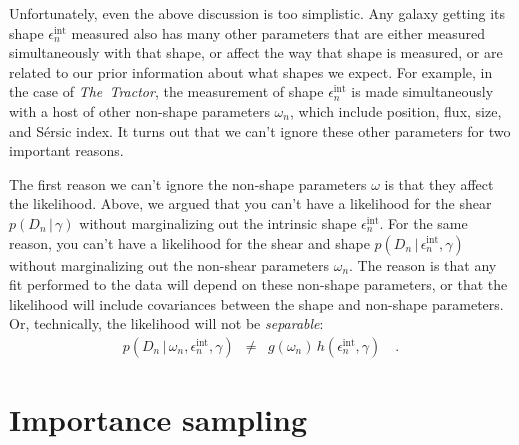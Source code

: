 \documentclass[12pt]{article}
\newcommand{\project}[1]{\textsl{#1}}
\newcommand{\thetractor}{\project{The~Tractor}}
\newcommand{\given}{\,|\,}
\newcommand{\data}{D}
\newcommand{\shear}{\gamma}
\newcommand{\ellip}{\epsilon}
\newcommand{\intrinsic}{\ellip^{\mathrm{int}}}
\newcommand{\nspars}{\omega}
\begin{document}
Unfortunately, even the above discussion is too simplistic.
Any galaxy getting its shape $\intrinsic_n$ measured
  also has many other parameters that are either measured simultaneously with that shape,
  or affect the way that shape is measured,
  or are related to our prior information about what shapes we expect.
For example, in the case of \thetractor,
  the measurement of shape $\intrinsic_n$ is made simultaneously with a host of other
  non-shape parameters $\nspars_n$,
  which include position, flux, size, and S\'ersic index.
It turns out that we can't ignore these other parameters for two important reasons.

The first reason we can't ignore the non-shape parameters $\nspars$ is that they affect the likelihood.
Above, we argued that you can't have a likelihood for the shear $p(\data_n\given\shear)$ 
  without marginalizing out the intrinsic shape $\intrinsic_n$.
For the same reason, you can't have a likelihood for the shear and shape $p(\data_n\given\intrinsic_n,\shear)$
  without marginalizing out the non-shear parameters $\nspars_n$.
The reason is that any fit performed to the data will depend on these non-shape parameters,
  or that the likelihood will include covariances between the shape and non-shape parameters.
Or, technically, the likelihood will not be \emph{separable}:
\begin{eqnarray}
p(\data_n\given\nspars_n,\intrinsic_n,\shear)
  &\ne& g(\nspars_n)\,h(\intrinsic_n,\shear)
  \quad .
\end{eqnarray}

\section{Importance sampling}
\end{document}
